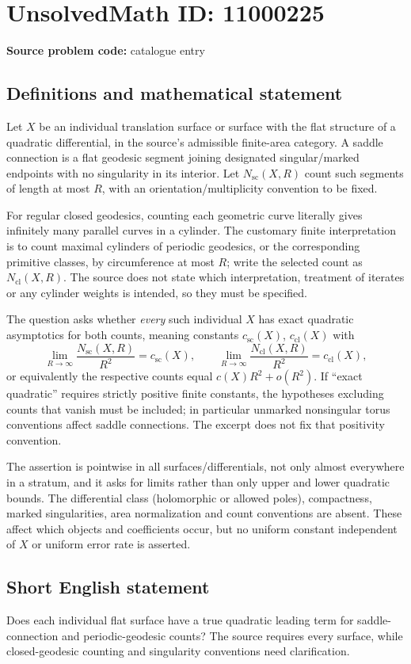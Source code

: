 \documentclass[11pt]{article}
\begin{document}
\section*{UnsolvedMath ID: 11000225}
\textbf{Source problem code:} catalogue entry
\subsection{Definitions and mathematical statement}
Let \(X\) be an individual translation surface or surface with the flat structure of a quadratic differential, in the source's admissible finite-area category. A saddle connection is a flat geodesic segment joining designated singular/marked endpoints with no singularity in its interior. Let \(N_{\mathrm{sc}}(X,R)\) count such segments of length at most \(R\), with an orientation/multiplicity convention to be fixed.

For regular closed geodesics, counting each geometric curve literally gives infinitely many parallel curves in a cylinder. The customary finite interpretation is to count maximal cylinders of periodic geodesics, or the corresponding primitive classes, by circumference at most \(R\); write the selected count as \(N_{\mathrm{cl}}(X,R)\). The source does not state which interpretation, treatment of iterates or any cylinder weights is intended, so they must be specified.

The question asks whether \emph{every} such individual \(X\) has exact quadratic asymptotics for both counts, meaning constants \(c_{\mathrm{sc}}(X)\), \(c_{\mathrm{cl}}(X)\) with
\[\lim_{R\to\infty}\frac{N_{\mathrm{sc}}(X,R)}{R^2}=c_{\mathrm{sc}}(X),\qquad
\lim_{R\to\infty}\frac{N_{\mathrm{cl}}(X,R)}{R^2}=c_{\mathrm{cl}}(X),\]
or equivalently the respective counts equal \(c(X)R^2+o(R^2)\). If ``exact quadratic'' requires strictly positive finite constants, the hypotheses excluding counts that vanish must be included; in particular unmarked nonsingular torus conventions affect saddle connections. The excerpt does not fix that positivity convention.

The assertion is pointwise in all surfaces/differentials, not only almost everywhere in a stratum, and it asks for limits rather than only upper and lower quadratic bounds. The differential class (holomorphic or allowed poles), compactness, marked singularities, area normalization and count conventions are absent. These affect which objects and coefficients occur, but no uniform constant independent of \(X\) or uniform error rate is asserted.
\subsection{Short English statement}
Does each individual flat surface have a true quadratic leading term for saddle-connection and periodic-geodesic counts? The source requires every surface, while closed-geodesic counting and singularity conventions need clarification.
\end{document}
